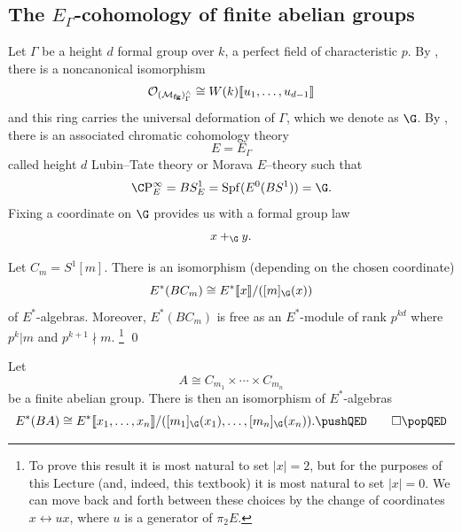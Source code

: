 
\subsection*{The \(E_{\Gamma}\)-cohomology of finite abelian groups}



Let \(\Gamma\) be a height \(d\) formal group over \(k\), a perfect field of characteristic \(p\).
By , there is a noncanonical isomorphism 
\[
\mathcal{O}_{(\mathcal{M}_{\mathbf{fg}})^\wedge_\Gamma} \cong W(k)\llbracket{u_1, \ldots, u_{d-1}}\rrbracket
\] 
and this ring carries the universal deformation of \(\Gamma\), which we denote as \(\G\).
By , there is an associated chromatic cohomology theory
\[
E = E_{\Gamma}
\]
called height \(d\) Lubin--Tate theory or Morava \(E\)--theory such that
\[
\CP^\infty_E = BS^1_E = \Spf(E^0(BS^1)) = \G.
\]
Fixing a coordinate on \(\G\) provides us with a formal group law
\[
x +_{\G} y.
\]

\begin{proposition} \label{app:cyclic}
Let \(C_{m} = S^1[m]\).
There is an isomorphism (depending on the chosen coordinate) 
\[
E^*(BC_{m}) \cong E^*\ps{x}/([m]_{\G}(x))
\]
of \(E^*\)-algebras.
Moreover, \(E^*(BC_{m})\) is free as an \(E^*\)-module of rank \(p^{kd}\) where \(p^k|m\) and \(p^{k+1} \nmid m\).%
\footnote{%
    To prove this result it is most natural to set \(|x| = 2\), but for the purposes of this Lecture (and, indeed, this textbook) it is most natural to set \(|x| = 0\).
    We can move back and forth between these choices by the change of coordinates \(x \leftrightarrow ux\), where \(u\) is a generator of \(\pi_2 E\).
}
\pushQED\qed \qedhere \popQED
\end{proposition}

\begin{corollary} \label{app:ab}
Let 
\[
A \cong C_{m_1} \times \cdots \times C_{m_n}
\]
be a finite abelian group.
There is then an isomorphism of \(E^*\)-algebras
\[
E^*(BA) \cong E^*\ps{x_1, \ldots, x_{n}}/([m_1]_{\G}(x_1), \ldots, [m_n]_{\G}(x_n)).
\pushQED\qed \qedhere \popQED
\]
\end{corollary}


